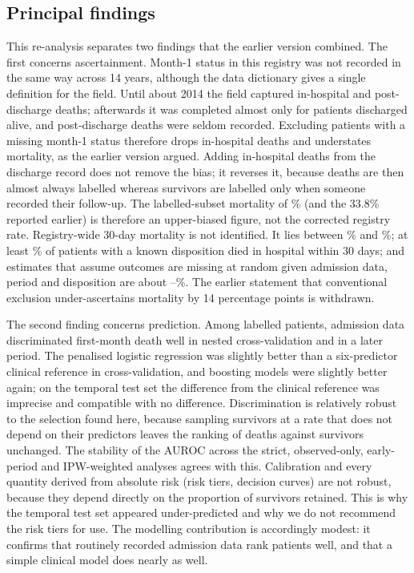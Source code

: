 \documentclass[preprint,10pt]{elsarticle}
\begin{document}
\subsection{Principal findings}
This re-analysis separates two findings that the earlier version combined. The first concerns ascertainment. Month-1 status in this registry was not recorded in the same way across 14 years, although the data dictionary gives a single definition for the field. Until about 2014 the field captured in-hospital and post-discharge deaths; afterwards it was completed almost only for patients discharged alive, and post-discharge deaths were seldom recorded. Excluding patients with a missing month-1 status therefore drops in-hospital deaths and understates mortality, as the earlier version argued. Adding in-hospital deaths from the discharge record does not remove the bias; it reverses it, because deaths are then almost always labelled whereas survivors are labelled only when someone recorded their follow-up. The labelled-subset mortality of \Mortlab\% (and the 33.8\% reported earlier) is therefore an upper-biased figure, not the corrected registry rate. Registry-wide 30-day mortality is not identified. It lies between \BoundLo\% and \BoundHi\%; at least \Mortinhosp\% of patients with a known disposition died in hospital within 30 days; and estimates that assume outcomes are missing at random given admission data, period and disposition are about \Mortipw--\DeltaMARearly\%. The earlier statement that conventional exclusion under-ascertains mortality by 14 percentage points is withdrawn.

The second finding concerns prediction. Among labelled patients, admission data discriminated first-month death well in nested cross-validation and in a later period. The penalised logistic regression was slightly better than a six-predictor clinical reference in cross-validation, and boosting models were slightly better again; on the temporal test set the difference from the clinical reference was imprecise and compatible with no difference. Discrimination is relatively robust to the selection found here, because sampling survivors at a rate that does not depend on their predictors leaves the ranking of deaths against survivors unchanged. The stability of the AUROC across the strict, observed-only, early-period and IPW-weighted analyses agrees with this. Calibration and every quantity derived from absolute risk (risk tiers, decision curves) are not robust, because they depend directly on the proportion of survivors retained. This is why the temporal test set appeared under-predicted and why we do not recommend the risk tiers for use. The modelling contribution is accordingly modest: it confirms that routinely recorded admission data rank patients well, and that a simple clinical model does nearly as well.
\end{document}

